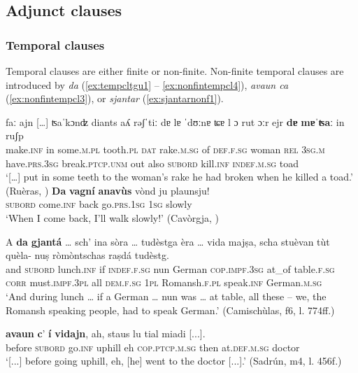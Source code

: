 \subsection{Adjunct clauses}

\subsubsection{Temporal clauses}
Temporal clauses are either finite or non-finite. Non-finite temporal clauses are introduced by \textit{da} (\ref{ex:tempcltgu1} -- \ref{ex:nonfintempcl4}),  \textit{avaun ca} (\ref{ex:nonfintempcl3}), or \textit{sjantar} (\ref{ex:sjantarnonf1}).

\ea
\label{ex:tempcltgu1}
\gll    […] faː ajn […] ʦaˈkɔnʣ diants aʎ rǝʃˈtiː dɐ lɐ ˈdʊːnɐ ʨɐ l ɔ rut ɔːr ejr \textbf{dɐ} \textbf{mɐˈʦaː} in ruʃp\\
{} make.\textsc{inf} in {} some.\textsc{m.pl} tooth.\textsc{pl} \textsc{dat} rake.\textsc{m.sg} of \textsc{def.f.sg} woman \textsc{rel} \textsc{3sg.m} have.\textsc{prs.3sg} break.\textsc{ptcp.unm} out also \textsc{subord} kill.\textsc{inf} \textsc{indef.m.sg} toad\\
\glt `[…] put in some teeth to the woman’s rake he had broken when he killed a toad.' (Ruèras, \citealt[8]{Valär2013b})
\z
\ea
\label{ex:nonfintempcl1}
\gll    \textbf{Da} \textbf{vagní} \textbf{anavùs} vònd ju plaunsju!\\
\textsc{subord} come.\textsc{inf} back go.\textsc{prs.1sg} \textsc{1sg} slowly \\
\glt `When I come back, I’ll walk slowly!' (Cavòrgja, \citealt[120]{Büchli1966})
\z

\ea
\label{ex:nonfintempcl4}
\gll    A \textbf{da} \textbf{gjantá} … sch’ ina sòra … tudèstga èra … vida majṣa, scha stuèvan tùt quèla- nuṣ ròmòntschas raṣdá tudèstg.\\
and \textsc{subord} lunch.\textsc{inf} {} if \textsc{indef.f.sg} nun {} German \textsc{cop.impf.3sg} {} at\_of table.\textsc{f.sg} \textsc{corr} must.\textsc{impf.3pl} all \textsc{dem.f.sg} \textsc{1pl} Romansh.\textsc{f.pl} speak.\textsc{inf} German.\textsc{m.sg}\\
\glt `And during lunch … if a German … nun was … at table, all these – we, the Romansh speaking people, had to speak German.' (Camischùlas, f6, l. 774ff.)
\z


\ea
\label{ex:nonfintempcl3}
\gll  [...] \textbf{avaun} \textbf{c}’ \textbf{í} \textbf{vidajn}, ah, staus lu tial miadi [...].\\
{} before \textsc{subord} go.\textsc{inf} uphill eh \textsc{cop.ptcp.m.sg} then  at.\textsc{def.m.sg} doctor\\
\glt `[...] before going uphill, eh, [he] went to the doctor [...].' (Sadrún, m4, l. 456f.)
\z

